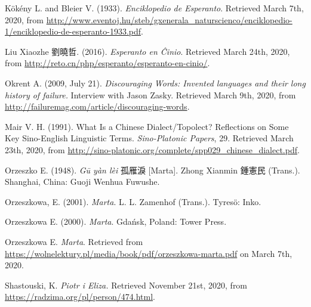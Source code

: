 Kökény L. and Bleier V. (1933). \textit{Enciklopedio de Esperanto}. Retrieved March 7th, 2020, from \url{http://www.eventoj.hu/steb/gxenerala_naturscienco/enciklopedio-1/enciklopedio-de-esperanto-1933.pdf}.


Liu Xiaozhe 劉曉哲. (2016). \textit{Esperanto en Ĉinio}. Retrieved March 24th, 2020, from \url{http://reto.cn/php/esperanto/esperanto-en-cinio/}.


Okrent A. (2009, July 21). \textit{Discouraging Words: Invented languages and their long history of failure.} Interview with Jason Zasky. Retrieved March 9th, 2020, from \url{http://failuremag.com/article/discouraging-words}.

Mair V. H. (1991). What Is a Chinese Dialect/Topolect? Reflections on Some Key Sino-English Linguistic Terms. \textit{Sino-Platonic Papers}, 29. Retrieved March 23th, 2020, from \url{http://sino-platonic.org/complete/spp029_chinese_dialect.pdf}.

Orzeszko E. (1948). \textit{Gū yàn lèi} 孤雁淚 [Marta]. Zhong Xianmin 鍾憲民 (Trans.). Shanghai, China: Guoji Wenhua Fuwushe.

Orzeszkowa, E. (2001). \textit{Marta}. L. L. Zamenhof (Trans.). Tyresö: Inko.


Orzeszkowa E. (2000). \textit{Marta}. Gdańsk, Poland: Tower Press.

Orzeszkowa E. \textit{Marta}. Retrieved from \url{https://wolnelektury.pl/media/book/pdf/orzeszkowa-marta.pdf} on March 7th, 2020.


Shastouski, K. \textit{Piotr i Eliza.} Retrieved November 21st, 2020, from \url{https://radzima.org/pl/person/474.html}.

